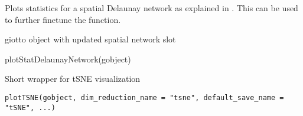 \documentclass[a4paper]{book}
\begin{document}
%
\begin{Details}\relax
Plots statistics for a spatial Delaunay network as explained in .
This can be used to further finetune the  function.
\end{Details}
%
\begin{Value}
giotto object with updated spatial network slot
\end{Value}
%
\begin{Examples}
\begin{ExampleCode}
    plotStatDelaunayNetwork(gobject)
\end{ExampleCode}
\end{Examples}
%
\begin{Description}\relax
Short wrapper for tSNE visualization
\end{Description}
%
\begin{Usage}
\begin{verbatim}
plotTSNE(gobject, dim_reduction_name = "tsne", default_save_name = "tSNE", ...)
\end{verbatim}
\end{Usage}
%
\end{document}
